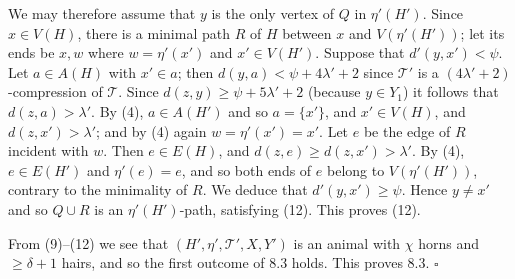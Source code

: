 We may therefore assume that $y$ is the only vertex of $Q$ in $\eta'(H')$. Since $x \in V(H)$, there is a minimal path $R$ of $H$ between $x$ and $V(\eta'(H'))$; let its ends be $x, w$ where $w = \eta'(x')$ and $x' \in V(H')$. Suppose that $d'(y, x') < \psi$. Let $a \in A(H)$ with $x' \in a$; then $d(y, a) < \psi + 4\lambda' + 2$ since $\mathscr{T}'$ is a $(4\lambda' + 2)$-compression of $\mathscr{T}$. Since $d(z, y) \ge \psi + 5\lambda' + 2$ (because $y \in Y_1$) it follows that $d(z, a) > \lambda'$. By (4), $a \in A(H')$ and so $a = \{x'\}$, and $x' \in V(H)$, and $d(z, x') > \lambda'$; and by (4) again $w = \eta'(x') = x'$. Let $e$ be the edge of $R$ incident with $w$. Then $e \in E(H)$, and $d(z, e) \ge d(z, x') > \lambda'$. By (4), $e \in E(H')$ and $\eta'(e) = e$, and so both ends of $e$ belong to $V(\eta'(H'))$, contrary to the minimality of $R$. We deduce that $d'(y, x') \ge \psi$. Hence $y \ne x'$ and so $Q \cup R$ is an $\eta'(H')$-path, satisfying (12). This proves (12).

From (9)--(12) we see that $(H', \eta', \mathscr{T}', X, Y')$ is an animal with $\chi$ horns and $\ge \delta + 1$ hairs, and so the first outcome of 8.3 holds. This proves 8.3. $\square$
